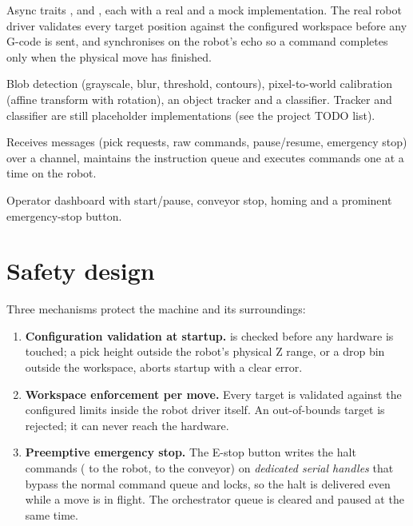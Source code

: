 \begin{description}[style=nextline]
  \item[Hardware layer (\cfg{src/hardware.rs})]
    Async traits ,  and
    , each with a real and a mock implementation.
    The real robot driver validates every target position against the
    configured workspace before any G-code is sent, and synchronises on
    the robot's  echo so a command completes only when the
    physical move has finished.
  \item[Vision layer (\cfg{src/vision/})]
    Blob detection (grayscale, blur, threshold, contours), pixel-to-world
    calibration (affine transform with rotation), an object tracker and a
    classifier. Tracker and classifier are still placeholder
    implementations (see the project TODO list).
  \item[Orchestrator (\cfg{src/orchestrator.rs})]
    Receives messages (pick requests, raw commands, pause/resume,
    emergency stop) over a channel, maintains the instruction queue and
    executes commands one at a time on the robot.
  \item[UI (\cfg{ui/app\_window.slint})]
    Operator dashboard with start/pause, conveyor stop, homing and a
    prominent emergency-stop button.
\end{description}

\section{Safety design}
\label{sec:safety}
%
Three mechanisms protect the machine and its surroundings:
\begin{enumerate}
  \item \textbf{Configuration validation at startup.} 
    is checked before any hardware is touched; a pick height outside the
    robot's physical Z range, or a drop bin outside the workspace, aborts
    startup with a clear error.
  \item \textbf{Workspace enforcement per move.} Every 
    target is validated against the configured limits inside the robot
    driver itself. An out-of-bounds target is rejected; it can never reach
    the hardware.
  \item \textbf{Preemptive emergency stop.} The E-stop button writes the
    halt commands ( to the robot,  to the conveyor) on
    \emph{dedicated serial handles} that bypass the normal command queue
    and locks, so the halt is delivered even while a move is in flight.
    The orchestrator queue is cleared and paused at the same time.
\end{enumerate}

